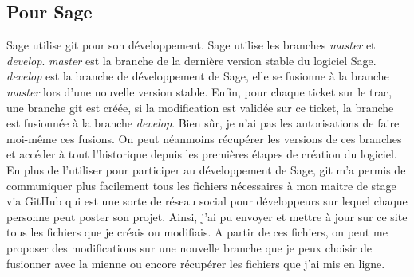 \documentclass[a4paper]{article}
\begin{document}
\subsection*{Pour Sage}
Sage utilise git pour son développement. Sage utilise les branches \textit{master} et \textit{develop}. \textit{master} est la branche de la dernière version stable du logiciel Sage. \textit{develop} est la branche de développement de Sage, elle se fusionne à la branche \textit{master} lors d'une nouvelle version stable. Enfin, pour chaque ticket sur le trac, une branche git est créée, si la modification est validée sur ce ticket, la branche est fusionnée à la branche \textit{develop}. Bien sûr, je n'ai pas les autorisations de faire moi-même ces fusions. On peut néanmoins récupérer les versions de ces branches et accéder à tout l'historique depuis les premières étapes de création du logiciel. \vspace{2\baselineskip}\\

En plus de l'utiliser pour participer au développement de Sage, git m'a permis de communiquer plus facilement tous les fichiers nécessaires à mon maitre de stage via GitHub qui est une sorte de réseau social pour développeurs sur lequel chaque personne peut poster son projet. Ainsi, j'ai pu envoyer et mettre à jour sur ce site tous les fichiers que je créais ou modifiais. A partir de ces fichiers, on peut me proposer des modifications sur une nouvelle branche que je peux choisir de fusionner avec la mienne ou encore récupérer les fichiers que j'ai mis en ligne.


\newpage
\thispagestyle{empty}
\end{document}
